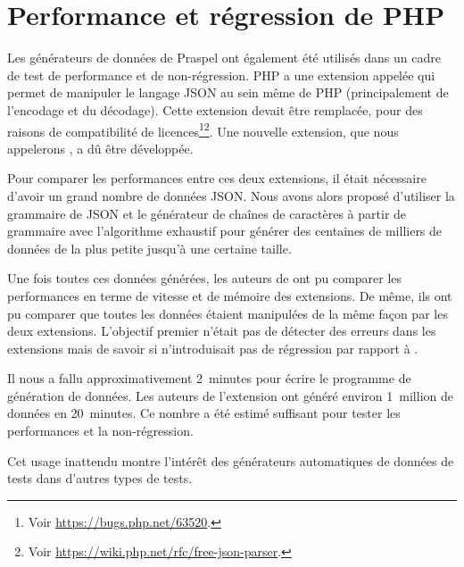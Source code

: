 \section{Performance et régression de PHP}
\label{section:experimentation:php}

Les générateurs de données de Praspel ont également été utilisés dans un cadre
de test de performance et de non-régression. PHP a une extension appelée
 qui permet de manipuler le langage JSON au sein même de PHP
(principalement de l'encodage et du décodage). Cette extension devait être
remplacée, pour des raisons de compatibilité de licences\footnote{Voir
\url{https://bugs.php.net/63520}.}\footnote{Voir
\url{https://wiki.php.net/rfc/free-json-parser}.}. Une nouvelle extension, que
nous appelerons , a dû être développée.

Pour comparer les performances entre ces deux extensions, il était nécessaire
d'avoir un grand nombre de données JSON. Nous avons alors proposé d'utiliser la
grammaire de JSON et le générateur de chaînes de caractères à partir de
grammaire avec l'algorithme exhaustif pour générer des centaines de milliers de
données de la plus petite jusqu'à une certaine taille.

Une fois toutes ces données générées, les auteurs de  ont pu
comparer les performances en terme de vitesse et de mémoire des extensions. De
même, ils ont pu comparer que toutes les données étaient manipulées de la même
façon par les deux extensions. L'objectif premier n'était pas de détecter des
erreurs dans les extensions mais de savoir si  n'introduisait
pas de régression par rapport à .

Il nous a fallu approximativement 2~minutes pour écrire le programme de
génération de données. Les auteurs de l'extension ont généré environ 1~million
de données en 20~minutes. Ce nombre a été estimé suffisant pour tester les
performances et la non-régression.

Cet usage inattendu montre l'intérêt des générateurs automatiques de données de
tests dans d'autres types de tests.
